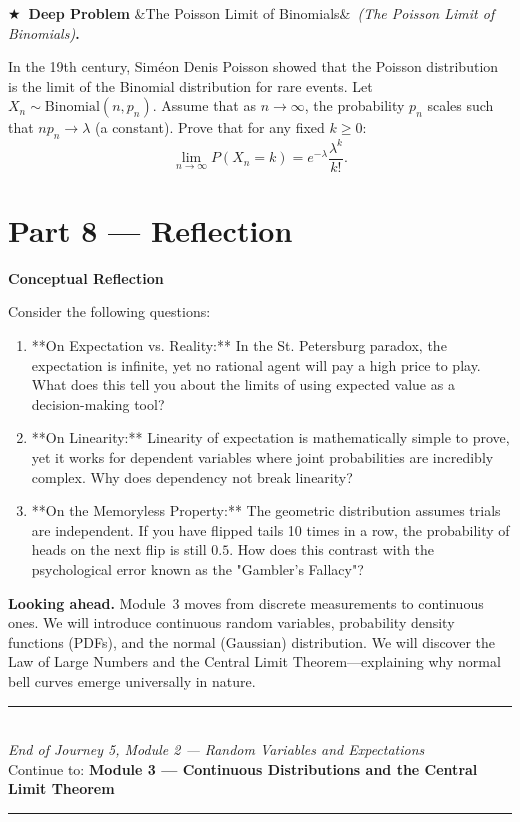 \documentclass[12pt, a4paper]{article}
\newcounter{problem}
\newcounter{deepproblem}
\newenvironment{deepproblem}[1][]{%
  \refstepcounter{deepproblem}%
  \par\vspace{6pt}%
  \noindent\textbf{\color{NavyBlue}$\bigstar$\ Deep Problem \thedeepproblem}%
  \ifx&#1&\else\ \textit{(#1)}\fi\textbf{.}\enskip
}{\par\vspace{4pt}}
\begin{document}
\begin{deepproblem}[The Poisson Limit of Binomials]
In the 19th century, Sim\'{e}on Denis Poisson showed that the Poisson distribution is the limit of the Binomial distribution for rare events.
Let $X_n \sim \text{Binomial}(n, p_n)$. Assume that as $n \to \infty$, the probability $p_n$ scales such that $n p_n \to \lambda$ (a constant).
Prove that for any fixed $k \ge 0$:
\[
  \lim_{n\to\infty} P(X_n = k) = e^{-\lambda} \frac{\lambda^k}{k!}.
\]
\end{deepproblem}

\newpage

\section{Part 8 \texorpdfstring{---}{--} Reflection}

\begin{reflectionbox}
\textbf{Conceptual Reflection}

Consider the following questions:
\begin{enumerate}
  \item **On Expectation vs. Reality:** In the St. Petersburg paradox, the expectation is infinite, yet no rational agent will pay a high price to play. What does this tell you about the limits of using expected value as a decision-making tool?
  \item **On Linearity:** Linearity of expectation is mathematically simple to prove, yet it works for dependent variables where joint probabilities are incredibly complex. Why does dependency not break linearity?
  \item **On the Memoryless Property:** The geometric distribution assumes trials are independent. If you have flipped tails 10 times in a row, the probability of heads on the next flip is still $0.5$. How does this contrast with the psychological error known as the "Gambler's Fallacy"?
\end{enumerate}
\end{reflectionbox}

\medskip
\noindent\textbf{Looking ahead.}
Module~3 moves from discrete measurements to continuous ones. We will introduce continuous random variables, probability density functions (PDFs), and the normal (Gaussian) distribution. We will discover the Law of Large Numbers and the Central Limit Theorem—explaining why normal bell curves emerge universally in nature.

\vspace{1.4cm}
\begin{center}
{\color{MidBlue}\rule{0.5\linewidth}{0.8pt}}\\[6pt]
{\small\color{DarkGrey}\textit{End of Journey 5, Module 2 --- Random Variables and Expectations}}\\[4pt]
{\small\color{DarkGrey}Continue to: \textbf{Module 3 --- Continuous Distributions and the Central Limit Theorem}}\\[6pt]
{\color{MidBlue}\rule{0.5\linewidth}{0.8pt}}
\end{center}
\end{document}

